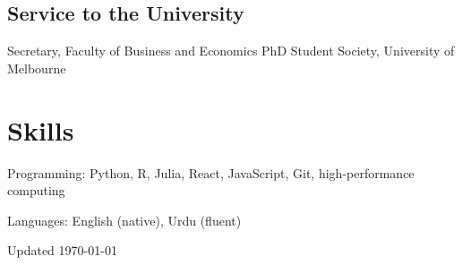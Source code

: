 \documentclass[11pt,letterpaper]{report}
\newcommand{\listitemspace}{0.25em}
\renewenvironment{itemize}
{\begin{list}{}{\setlength{\leftmargin}{0em}
                \setlength{\parskip}{0em}
                \setlength{\itemsep}{\listitemspace}
                \setlength{\parsep}{\listitemspace}}}
{\end{list}}
\begin{document}
    \subsection*{Service to the University}
    \begin{tablist}
        \item[2026] \tab{}Secretary, Faculty of Business and Economics PhD Student Society, University of Melbourne
    \end{tablist}

    \section*{Skills}

    \begin{itemize}
        \item Programming: Python, R, Julia, React, JavaScript, Git, high-performance computing
        \item Languages: English (native), Urdu (fluent)
    \end{itemize}

    \begin{center}
        \vfill
        Updated \monthyeardate\today
    \end{center}
\end{document}
